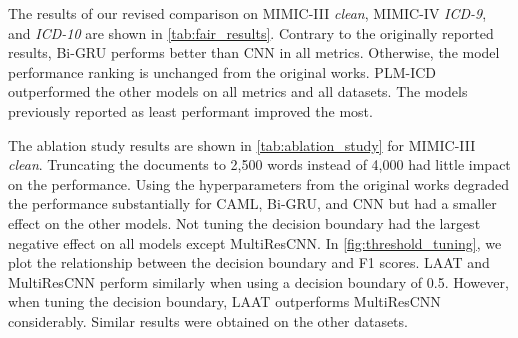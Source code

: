 {The results of our revised comparison on MIMIC-III \textit{clean}, MIMIC-IV \textit{ICD-9}, and \textit{ICD-10} are shown in \cref{tab:fair_results}. Contrary to the originally reported results, Bi-GRU performs better than CNN in all metrics. Otherwise, the model performance ranking is unchanged from the original works. PLM-ICD outperformed the other models on all metrics and all datasets. The models previously reported as least performant improved the most. 

The ablation study results are shown in \cref{tab:ablation_study} for MIMIC-III \textit{clean}. Truncating the documents to 2,500 words instead of 4,000 had little impact on the performance. Using the hyperparameters from the original works degraded the performance substantially for CAML, Bi-GRU, and CNN but had a smaller effect on the other models. Not tuning the decision boundary had the largest negative effect on all models except MultiResCNN. In \cref{fig:threshold_tuning}, we plot the relationship between the decision boundary and F1 scores. LAAT and MultiResCNN perform similarly when using a decision boundary of 0.5. However, when tuning the decision boundary, LAAT outperforms MultiResCNN considerably.
Similar results were obtained on the other datasets. 

\begin{sidewaystable}[t]
    \centering
    \caption[Ablation study on MIMIC-III \textit{clean}.]{Ablation study on MIMIC-III \textit{clean}. The numbers are the micro/macro F1 scores on the test set.}
    \label{tab:ablation_study}
\end{sidewaystable}


}
